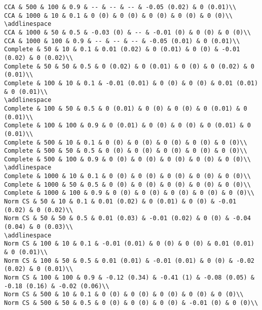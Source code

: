 \documentclass[
]{article}
\begin{document}
\begin{verbatim}
CCA & 500 & 100 & 0.9 & -- & -- & -- & -0.05 (0.02) & 0 (0.01)\\
CCA & 1000 & 10 & 0.1 & 0 (0) & 0 (0) & 0 (0) & 0 (0) & 0 (0)\\
\addlinespace
CCA & 1000 & 50 & 0.5 & -0.03 (0) & -- & -0.01 (0) & 0 (0) & 0 (0)\\
CCA & 1000 & 100 & 0.9 & -- & -- & -- & -0.05 (0.01) & 0 (0.01)\\
Complete & 50 & 10 & 0.1 & 0.01 (0.02) & 0 (0.01) & 0 (0) & -0.01 (0.02) & 0 (0.02)\\
Complete & 50 & 50 & 0.5 & 0 (0.02) & 0 (0.01) & 0 (0) & 0 (0.02) & 0 (0.01)\\
Complete & 100 & 10 & 0.1 & -0.01 (0.01) & 0 (0) & 0 (0) & 0.01 (0.01) & 0 (0.01)\\
\addlinespace
Complete & 100 & 50 & 0.5 & 0 (0.01) & 0 (0) & 0 (0) & 0 (0.01) & 0 (0.01)\\
Complete & 100 & 100 & 0.9 & 0 (0.01) & 0 (0) & 0 (0) & 0 (0.01) & 0 (0.01)\\
Complete & 500 & 10 & 0.1 & 0 (0) & 0 (0) & 0 (0) & 0 (0) & 0 (0)\\
Complete & 500 & 50 & 0.5 & 0 (0) & 0 (0) & 0 (0) & 0 (0) & 0 (0)\\
Complete & 500 & 100 & 0.9 & 0 (0) & 0 (0) & 0 (0) & 0 (0) & 0 (0)\\
\addlinespace
Complete & 1000 & 10 & 0.1 & 0 (0) & 0 (0) & 0 (0) & 0 (0) & 0 (0)\\
Complete & 1000 & 50 & 0.5 & 0 (0) & 0 (0) & 0 (0) & 0 (0) & 0 (0)\\
Complete & 1000 & 100 & 0.9 & 0 (0) & 0 (0) & 0 (0) & 0 (0) & 0 (0)\\
Norm CS & 50 & 10 & 0.1 & 0.01 (0.02) & 0 (0.01) & 0 (0) & -0.01 (0.02) & 0 (0.02)\\
Norm CS & 50 & 50 & 0.5 & 0.01 (0.03) & -0.01 (0.02) & 0 (0) & -0.04 (0.04) & 0 (0.03)\\
\addlinespace
Norm CS & 100 & 10 & 0.1 & -0.01 (0.01) & 0 (0) & 0 (0) & 0.01 (0.01) & 0 (0.01)\\
Norm CS & 100 & 50 & 0.5 & 0.01 (0.01) & -0.01 (0.01) & 0 (0) & -0.02 (0.02) & 0 (0.01)\\
Norm CS & 100 & 100 & 0.9 & -0.12 (0.34) & -0.41 (1) & -0.08 (0.05) & -0.18 (0.16) & -0.02 (0.06)\\
Norm CS & 500 & 10 & 0.1 & 0 (0) & 0 (0) & 0 (0) & 0 (0) & 0 (0)\\
Norm CS & 500 & 50 & 0.5 & 0 (0) & 0 (0) & 0 (0) & -0.01 (0) & 0 (0)\\

\end{verbatim}
\end{document}
